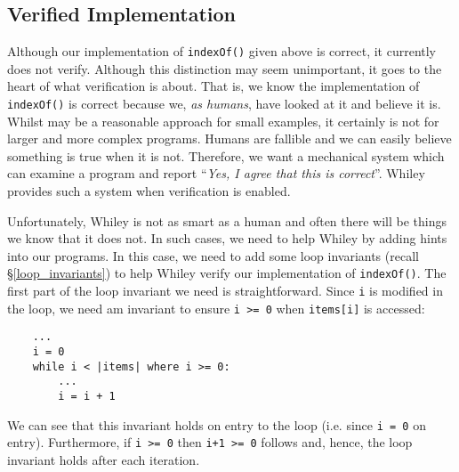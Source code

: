 \subsection{Verified Implementation}
Although our implementation of \lstinline{indexOf()} given above is
correct, it currently does not verify.  Although this distinction may
seem unimportant, it goes to the heart of what verification is about.
That is, we know the implementation of \lstinline{indexOf()} is
correct because we, {\em as humans}, have looked at it and believe it
is.  Whilst may be a reasonable approach for small examples, it
certainly is not for larger and more complex programs.  Humans are
fallible and we can easily believe something is true when it is not.
Therefore, we want a mechanical system which can examine a program and
report ``{\em Yes, I agree that this is correct}''.  Whiley provides
such a system when verification is enabled.  

Unfortunately, Whiley is not as smart as a human and often there will
be things we know that it does not.  In such cases, we need to help
Whiley by adding hints into our programs.  In this case, we need to
add some loop invariants (recall \S\ref{loop_invariants}) to help
Whiley verify our implementation of \lstinline{indexOf()}.  The first
part of the loop invariant we need is straightforward.  Since
\lstinline{i} is modified in the loop, we need am invariant to ensure
\lstinline{i >= 0} when \lstinline{items[i]} is accessed:

\begin{lstlisting}
    ...
    i = 0
    while i < |items| where i >= 0:
        ...
        i = i + 1    
\end{lstlisting}
We can see that this invariant holds on entry to the loop (i.e. since
\lstinline{i = 0} on entry).  Furthermore, if \lstinline{i >= 0} then \lstinline{i+1 >= 0} follows and, hence, the loop
invariant holds after each iteration.
